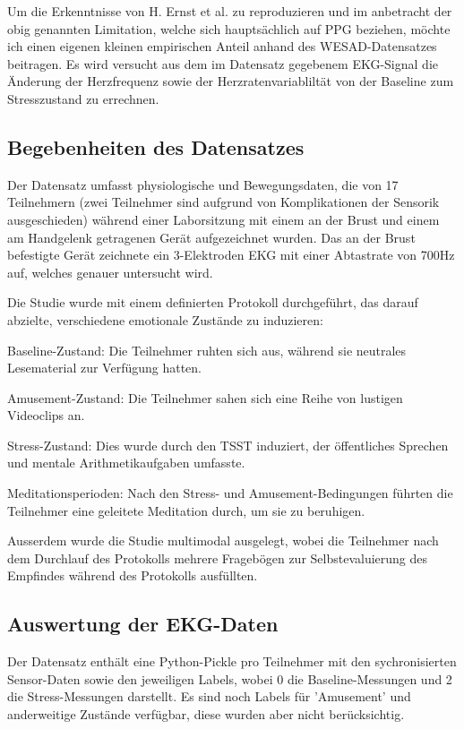 Um die Erkenntnisse von H. Ernst et al. zu reproduzieren und im anbetracht der obig genannten Limitation, welche sich hauptsächlich auf \ac{PPG} beziehen, möchte ich einen eigenen kleinen empirischen Anteil anhand des WESAD-Datensatzes \cite{Schmidt2018WESAD} beitragen. Es wird versucht aus dem im Datensatz gegebenem \ac{EKG}-Signal die Änderung der Herzfrequenz sowie der Herzratenvariabliltät von der Baseline zum Stresszustand zu errechnen.

\subsection{Begebenheiten des Datensatzes}
Der Datensatz umfasst physiologische und Bewegungsdaten, die von 17 Teilnehmern (zwei Teilnehmer sind aufgrund von Komplikationen der Sensorik ausgeschieden) während einer Laborsitzung mit einem an der Brust und einem am Handgelenk getragenen Gerät aufgezeichnet wurden. Das an der Brust befestigte Gerät zeichnete ein 3-Elektroden \ac{EKG} mit einer Abtastrate von 700Hz auf, welches genauer untersucht wird.

Die Studie wurde mit einem definierten Protokoll durchgeführt, das darauf abzielte, verschiedene emotionale Zustände zu induzieren:

Baseline-Zustand: Die Teilnehmer ruhten sich aus, während sie neutrales Lesematerial zur Verfügung hatten.

Amusement-Zustand: Die Teilnehmer sahen sich eine Reihe von lustigen Videoclips an.

Stress-Zustand: Dies wurde durch den \ac{TSST} induziert, der öffentliches Sprechen und mentale Arithmetikaufgaben umfasste.

Meditationsperioden: Nach den Stress- und Amusement-Bedingungen führten die Teilnehmer eine geleitete Meditation durch, um sie zu beruhigen.

Ausserdem wurde die Studie multimodal ausgelegt, wobei die Teilnehmer nach dem Durchlauf des Protokolls mehrere Fragebögen zur Selbstevaluierung des Empfindes während des Protokolls
ausfüllten.

\subsection{Auswertung der EKG-Daten}

Der Datensatz enthält eine Python-Pickle pro Teilnehmer mit den sychronisierten Sensor-Daten sowie den jeweiligen Labels, wobei 0 die Baseline-Messungen und 2 die Stress-Messungen darstellt.
Es sind noch Labels für 'Amusement' und anderweitige Zustände verfügbar, diese wurden aber nicht berücksichtig.

